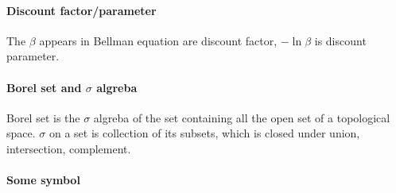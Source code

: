 \paragraph{Discount factor/parameter}
The $\beta$ appears in Bellman equation are discount factor, $-\ln\beta$ is discount parameter.

\paragraph{Borel set and $\sigma$ algreba}
Borel set is the $\sigma$ algreba of the set containing all the open set of a topological space.
$\sigma$ on a set is collection of its subsets, which is closed under  union, intersection, complement.

\paragraph{Some symbol}
